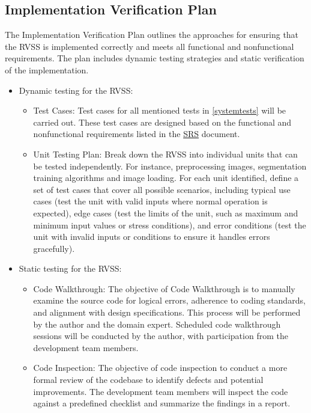 \documentclass[12pt, titlepage]{article}
\begin{document}
\subsection{Implementation Verification Plan}
\label{implementation_verification_plan}
The Implementation Verification Plan outlines the approaches for ensuring that the RVSS is implemented correctly and meets all functional and nonfunctional requirements. The plan includes dynamic testing strategies and  static verification of the implementation. 
\begin{itemize}
    \item Dynamic testing for the RVSS:
        \begin{itemize}
            \item Test Cases: Test cases for all mentioned tests in \autoref{systemtests} will be carried out. These test cases are designed based on the functional and nonfunctional requirements listed in the \href{https://github.com/lele0007/Blood-vessel-segmentation/blob/main/docs/SRS/SRS.pdf}{SRS} document. 

            \item Unit Testing Plan: Break down the RVSS into individual units that can be tested independently. For instance, preprocessing images, segmentation training algorithms and image loading. For each unit identified, define a set of test cases that cover all possible scenarios, including typical use cases (test the unit with valid inputs where normal operation is expected), edge cases (test the limits of the unit, such as maximum and minimum input values or stress conditions), and error conditions (test the unit with invalid inputs or conditions to ensure it handles errors gracefully).
        \end{itemize}
    \item Static testing for the RVSS:
        \begin{itemize}
            \item Code Walkthrough: The objective of Code Walkthrough is to manually examine the source code for logical errors, adherence to coding standards, and alignment with design specifications. This process will be performed by the author and the domain expert. Scheduled code walkthrough sessions will be conducted by the author, with participation from the development team members.
            \item Code Inspection: The objective of code inspection to conduct a more formal review of the codebase to identify defects and potential improvements. The development team members will inspect the code against a predefined checklist and summarize the findings in a report.
        \end{itemize}
\end{itemize}
\end{document}
